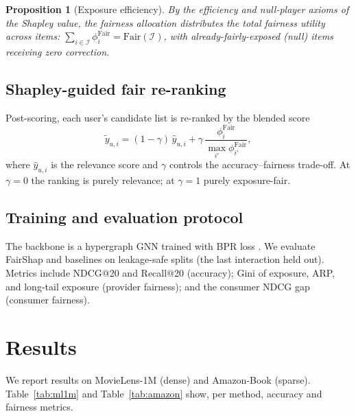 \documentclass[pdflatex,sn-mathphys-num]{sn-jnl}%
\theoremstyle{thmstyleone}%
\newtheorem{proposition}[theorem]{Proposition}%
\theoremstyle{thmstyletwo}%
\theoremstyle{thmstylethree}%
\newcommand{\fair}{\mathrm{Fair}}
\begin{document}
\begin{proposition}[Exposure efficiency]\label{prop1}
By the efficiency and null-player axioms of the Shapley value, the fairness allocation distributes the total fairness utility across items: $\sum_{i\in\mathcal{I}}\phi_i^{\fair}=\fair(\mathcal{I})$, with already-fairly-exposed (null) items receiving zero correction.
\end{proposition}

\subsection{Shapley-guided fair re-ranking}
Post-scoring, each user's candidate list is re-ranked by the blended score
\begin{equation}\label{eq:rerank}
\tilde{y}_{u,i}=(1-\gamma)\,\hat{y}_{u,i}+\gamma\,\frac{\phi_i^{\fair}}{\max_{i'}\phi_{i'}^{\fair}},
\end{equation}
where $\hat{y}_{u,i}$ is the relevance score and $\gamma$ controls the accuracy--fairness trade-off. At $\gamma=0$ the ranking is purely relevance; at $\gamma=1$ purely exposure-fair.

\subsection{Training and evaluation protocol}
The backbone is a hypergraph GNN trained with BPR loss \cite{rendle2009bpr}. We evaluate FairShap and baselines on leakage-safe splits (the last interaction held out). Metrics include NDCG@20 and Recall@20 (accuracy); Gini of exposure, ARP, and long-tail exposure (provider fairness); and the consumer NDCG gap (consumer fairness).

\section{Results}\label{sec4}

We report results on MovieLens-1M (dense) and Amazon-Book (sparse). Table~\ref{tab:ml1m} and Table~\ref{tab:amazon} show, per method, accuracy and fairness metrics.
\end{document}
